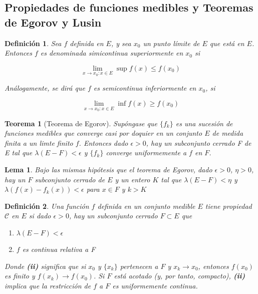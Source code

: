 \documentclass{article}
\newtheorem{theorem}{Teorema}
\newtheorem{lemma}{Lema}
\newtheorem{definition}{Definición}
\begin{document}
\subsection{Propiedades de funciones medibles y Teoremas de Egorov y Lusin}

\begin{definition}
Sea $f$ definida en $E$, y sea $x_0$ un punto límite de $E$ que está en $E$. Entonces $f$ es denominada simicontinua superiormente en $x_0$ si

\begin{equation}
\lim_{x \to x_0: x \in E} \sup f(x) \leq f(x_0)
\end{equation}

Análogamente, se dirá que $f$ es semicontinua inferiormente en $x_0$, si

\begin{equation}
\lim_{x \to x_0: x \in E} \inf f(x) \geq f(x_0)
\end{equation}
\end{definition}

\begin{theorem}[Teorema de Egorov]
Supóngase que $\{f_k\}$ es una sucesión de funciones medibles que converge casi por doquier en un conjunto $E$ de medida finita a un limte finito $f$. Entonces dado $\epsilon > 0$, hay un subconjunto cerrado F de E tal que $\lambda(E-F) < \epsilon$ y $\{f_k\}$ converge uniformemente a $f$ en $F$.
\end{theorem}

\begin{lemma}
Bajo las mismas hipótesis que el teorema de Egorov, dado $\epsilon > 0$, $\eta > 0$, hay un $F$ subconjunto cerrado de $E$ y un entero $K$ tal que $\lambda(E-F) < \eta$ y $\lambda(f(x) - f_k(x)) < \epsilon$ para $x \in F$ y $k > K$
\end{lemma}

\begin{definition}
Una función $f$ definida en un conjunto medible $E$ tiene propiedad $\mathscr{C}$ en $E$ si dado $\epsilon > 0$, hay un subconjunto cerrado $F \subset E$ que

\begin{enumerate}[label=(\roman*)]
\item $\lambda(E-F) < \epsilon$
\item $f$ es continua relativa a F
\end{enumerate}

Donde \textbf{(ii)} significa que si $x_0$ y $\{x_k\}$ pertenecen a $F$ y $x_k \rightarrow x_0$, entonces $f(x_0)$ es finito y $f(x_k) \rightarrow f(x_0)$. Si $F$ está acotado (y, por tanto, compacto), \textbf{(ii)} implica que la restricción de $f$ a $F$ es uniformemente continua.
\end{definition}
\end{document}

